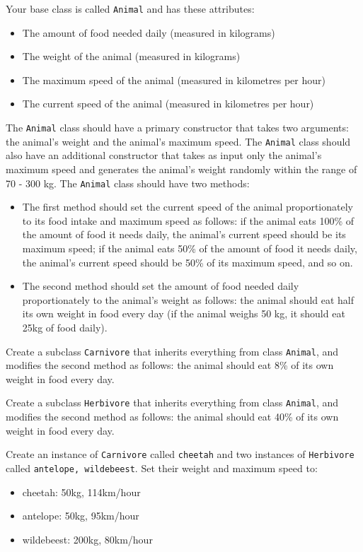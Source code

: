 \documentclass[a4paper,12pt]{article}
\begin{document}
\begin{enumerate}[label=10ø.\arabic*,start=0]
  Your base class is called \texttt{Animal} and has these attributes: 
  \begin{itemize}
  \item The amount of food needed daily (measured in kilograms)
  \item The weight of the animal (measured in kilograms)
  \item The maximum speed of the animal (measured in kilometres per hour)
  \item The current speed of the animal (measured in kilometres per hour)
  \end{itemize}
  The \texttt{Animal} class should have a primary constructor that takes two arguments: the animal's weight and the animal's maximum speed. The \texttt{Animal} class should also have an additional constructor that takes as input only the animal's maximum speed and generates the animal's weight randomly within the range of 70 - 300 kg. The \texttt{Animal} class should have two methods:
  \begin{itemize}
  \item The first method should set the current speed of the animal proportionately to its food intake and maximum speed as follows: if the animal eats 100\% of the amount of food it needs daily, the animal's current speed should be its maximum speed; if the animal eats 50\% of the amount of food it needs daily, the animal's current speed should be 50\% of its maximum speed, and so on.
  \item The second method should set the amount of food needed daily proportionately to the animal's weight as follows: the animal should eat half its own weight in food every day (if the animal weighs 50 kg, it should eat 25kg of food daily).
  \end{itemize}
  
  
  Create a subclass \texttt{Carnivore} that inherits everything from class \texttt{Animal}, and modifies the second method as follows: the animal should eat 8\% of its own weight in food every day.
  
  Create a subclass \texttt{Herbivore} that inherits everything from class \texttt{Animal}, and modifies the second method as follows: the animal should eat 40\% of its own weight in food every day.
  
  Create an instance of \texttt{Carnivore} called \texttt{cheetah} and two instances of \texttt{Herbivore} called \texttt{antelope, wildebeest}. Set their weight and maximum speed to:
  \begin{itemize}
  \item cheetah: 50kg, 114km/hour
  \item antelope: 50kg, 95km/hour
  \item wildebeest: 200kg, 80km/hour
  \end{itemize}
  

\end{enumerate}
\end{document}
